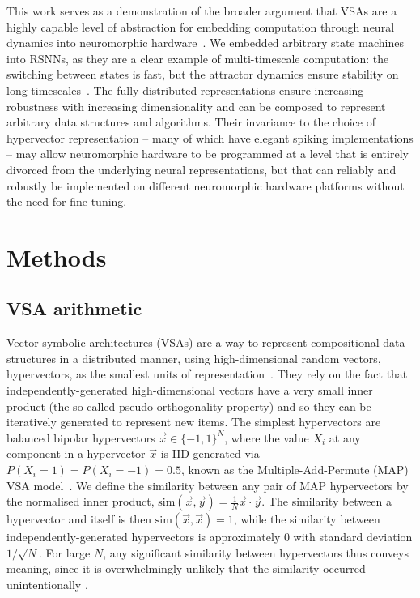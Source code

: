 This work serves as a demonstration of the broader argument that VSAs are a highly capable level of abstraction for embedding computation through neural dynamics into neuromorphic hardware~\cite{kleyko_vector_2022}. 
We embedded arbitrary state machines into RSNNs, as they are a clear example of multi-timescale computation: the switching between states is fast, but the attractor dynamics ensure stability on long timescales~\cite{hopfield_neural_1982, amit_modeling_1989}.
The fully-distributed representations ensure increasing robustness with increasing dimensionality and can be composed to represent arbitrary data structures and algorithms.
Their invariance to the choice of hypervector representation -- many of which have elegant spiking implementations -- may allow neuromorphic hardware to be programmed at a level that is entirely divorced from the underlying neural representations, but that can reliably and robustly be implemented on different neuromorphic hardware platforms without the need for fine-tuning.












\section{Methods}
\label{sec:methods}

\subsection{VSA arithmetic}

Vector symbolic architectures (VSAs) are a way to represent compositional data structures in a distributed manner, using high-dimensional random vectors, hypervectors, as the smallest units of representation~\cite{kleyko_survey_2022, gayler_multiplicative_1998, kanerva_hyperdimensional_2009, plate_holographic_1995}. They rely on the fact that independently-generated high-dimensional vectors have a very small inner product (the so-called pseudo orthogonality property) and so they can be iteratively generated to represent new items. The simplest hypervectors are balanced bipolar hypervectors $\vec{x} \in \{-1,1\}^N$, where the value $X_i$ at any component in a hypervector $\vec{x}$ is IID generated via \mbox{$P(X_i = 1) = P(X_i = -1) = 0.5$}, known as the Multiple-Add-Permute (MAP) VSA model~\cite{gayler_multiplicative_1998, kleyko_survey_2022}. We define the similarity between any pair of MAP hypervectors by the normalised inner product, $\mathrm{sim}(\vec{x}, \vec{y}) = \frac{1}{N} \vec{x} \cdot \vec{y}$. The similarity between a hypervector and itself is then $\mathrm{sim}(\vec{x}, \vec{x} ) = 1$, while the similarity between independently-generated hypervectors is approximately 0 with standard deviation $1/\sqrt{N}$.
For large $N$, any significant similarity between hypervectors thus conveys meaning, since it is overwhelmingly unlikely that the similarity occurred unintentionally \cite{kanerva_hyperdimensional_2009, thomas_theoretical_2022}.



